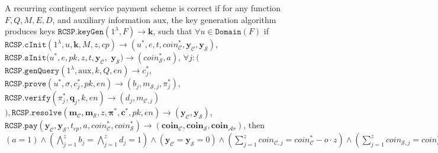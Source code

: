 \begin{definition}[RC-S-P Correctness] A recurring contingent service payment  scheme  is  correct   if for any function $F, Q, M, E, D$, and auxiliary information $\text{aux}$, the key generation algorithm produces keys $\mathtt{RCSP}.\mathtt{keyGen}(1^{\scriptscriptstyle\lambda},F)\rightarrow \bm{k}$,   such that $\forall u \in \mathtt{Domain}(F)$ if $\mathtt{RCSP}.\mathtt{cInit}(1^{\scriptscriptstyle\lambda}, u,\bm{k}, M,z,cp) \rightarrow (u^{\scriptscriptstyle *}, e, t, coin^{\scriptscriptstyle*}_{\scriptscriptstyle\mathcal C},\bm{y}_{\scriptscriptstyle \mathcal  C},\bm{y}_{\scriptscriptstyle \mathcal  S})$, $\mathtt{RCSP}.\mathtt{sInit} (u^{\scriptscriptstyle *}, e, pk, z, t,\bm{y}_{\scriptscriptstyle \mathcal C},$ $\bm{y}_{\scriptscriptstyle \mathcal S})\rightarrow (coin^{\scriptscriptstyle *}_{\scriptscriptstyle\mathcal S}, a)$,   $\forall j:\Big($$\mathtt{RCSP}.\mathtt{genQuery}(1^{\lambda}, \text{aux}, k, Q,  en)\rightarrow c^{\scriptscriptstyle *}_{\scriptscriptstyle j}$, $\mathtt{RCSP}.\mathtt{prove}(u^{\scriptscriptstyle *},  \sigma, c^{\scriptscriptstyle *}_{\scriptscriptstyle j}, pk,  en)\rightarrow (b_{\scriptscriptstyle j},m_{\scriptscriptstyle\mathcal {S},j},\pi^{\scriptscriptstyle *}_{\scriptscriptstyle j})$, \\$\mathtt{RCSP}.\mathtt{verify}(\pi^{\scriptscriptstyle *}_{\scriptscriptstyle j}, \bm{q}_{\scriptscriptstyle j},k,en)\rightarrow (d_{\scriptscriptstyle j}, m_{\scriptscriptstyle\mathcal {C},j})$$\Big), \mathtt{RCSP}.\mathtt{resolve}(\bm{m}_{\scriptscriptstyle \mathcal{C}},\bm{m}_{\scriptscriptstyle \mathcal{S}},z, {\bm{\pi}}^{\scriptscriptstyle *}, {\bm{c}}^{\scriptscriptstyle *},pk,en)\rightarrow (\bm{y}_{\scriptscriptstyle \mathcal C},\bm{y}_{\scriptscriptstyle \mathcal S})$, \\$\mathtt{RCSP}.\mathtt{pay}(\bm{y}_{\scriptscriptstyle \mathcal C},\bm{y}_{\scriptscriptstyle \mathcal S},t_{\scriptscriptstyle cp},a,coin^{\scriptscriptstyle *}_{\scriptscriptstyle\mathcal C},coin^{\scriptscriptstyle *}_{\scriptscriptstyle\mathcal S})\rightarrow (\bm{coin}_{\scriptscriptstyle\mathcal C},\bm{coin}_{\scriptscriptstyle\mathcal S},\bm{coin}_{\scriptscriptstyle\mathcal Ar})$, then $(a=1)\wedge (\bigwedge\limits^{\scriptscriptstyle z}_{\scriptscriptstyle j=1} b_{\scriptscriptstyle j}= \bigwedge\limits^{\scriptscriptstyle z}_{\scriptscriptstyle j=1} d_{\scriptscriptstyle j}=1)\wedge (\bm{y}_{\scriptscriptstyle \mathcal C}=\bm{y}_{\scriptscriptstyle \mathcal S}=0) \wedge (\sum\limits^{\scriptscriptstyle z}_{\scriptscriptstyle j=1}coin_{\scriptscriptstyle\mathcal C,j}=coin^{\scriptscriptstyle *}_{\scriptscriptstyle\mathcal C}-o\cdot z) \wedge  (\sum\limits^{\scriptscriptstyle z}_{\scriptscriptstyle j=1}coin_{\scriptscriptstyle\mathcal S,j}=coin^{\scriptscriptstyle *}_{\scriptscriptstyle\mathcal S}+o\cdot z)  \wedge (\sum\limits^{\scriptscriptstyle z}_{\scriptscriptstyle j=1}coin_{\scriptscriptstyle\mathcal Ar,j}=0)$
\end{definition}


